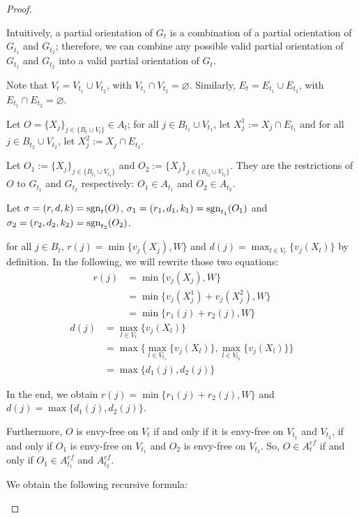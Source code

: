 \begin{proof}
\begin{lemma}
    \end{lemma}

    Intuitively, a partial orientation of $G_t$ is a combination of a partial orientation of $G_{t_1}$ and $G_{t_2}$; therefore, we can combine any possible valid partial orientation of $G_{t_1}$ and $G_{t_2}$ into a valid partial orientation of $G_t$.
    \begin{nestedproof}
    Note that $V_t=V_{t_1}\cup V_{t_2}$, with $V_{t_1}\cap V_{t_2}=\varnothing$. Similarly, $E_t=E_{t_1}\cup E_{t_2}$, with $E_{t_1}\cap E_{t_2}=\varnothing$.

    Let $O=\{X_j\}_{j\in\{B_t\cup V_t\}}\in A_t$; for all $j\in B_{t_1}\cup V_{t_1}$, let $X_j^1:=X_j\cap E_{t_1}$ and
    for all $j\in B_{t_2}\cup V_{t_2}$, let $X_j^2:=X_j\cap E_{t_2}$.

    Let $O_1:=\{X_j\}_{j\in\{B_{t_1}\cup V_{t_1}\}} $ and $O_2:=\{X_j\}_{j\in\{B_{t_2}\cup V_{t_2}\}}$. They are the restrictions of $O$ to $G_{t_1}$ and $G_{t_2}$ respectively: $O_1\in A_{t_1}$ and $O_2\in A_{t_2}$.

    Let $\sigma=(r,d,k)=\operatorname{sgn}_t(O)$, $\sigma_1=(r_1,d_1,k_1)=\operatorname{sgn}_{t_1}(O_1)$ and $\sigma_2=(r_2,d_2,k_2)=\operatorname{sgn}_{t_2}(O_2)$.

    for all $j\in B_t$, $r(j)=\min\{v_j(X_j),W\}$ and $d(j)=\max_{l\in V_t}\{v_j(X_l)\}$ by definition. In the following, we will rewrite those two equations:
    \begin{align*}
        r(j) & = \min\{v_j(X_j),W\}\\ &=\min \{v_j(X_j^1)+v_j(X_j^2),W\}\\ &=\min\{r_1(j)+r_2(j),W\}
    \end{align*}
    \begin{align*}
        d(j)&=\max_{l\in V_t}\{v_j(X_l)\}\\&=\max\{\max_{l\in V_{t_1}}\{v_j(X_l)\},\max_{l\in V_{t_2}}\{v_j(X_l)\}\}\\&=\max\{d_1(j),d_2(j)\}
    \end{align*}

    In the end, we obtain $r(j)=\min\{r_1(j)+r_2(j),W\}$ and $d(j)=\max\{d_1(j),d_2(j)\}$.

    Furthermore, $O$ is envy-free on $V_t$ if and only if it is envy-free on $V_{t_1}$ and $V_{t_2}$, if and only if $O_1$ is envy-free on $V_{t_1}$ and $O_2$ is envy-free on $V_{t_2}$. So, $O\in A_t^{ef}$ if and only if $O_1\in A_{t_1}^{ef}$ and $A_{t_2}^{ef}$.

    We obtain the following recursive formula:



\end{nestedproof}
\end{proof}
